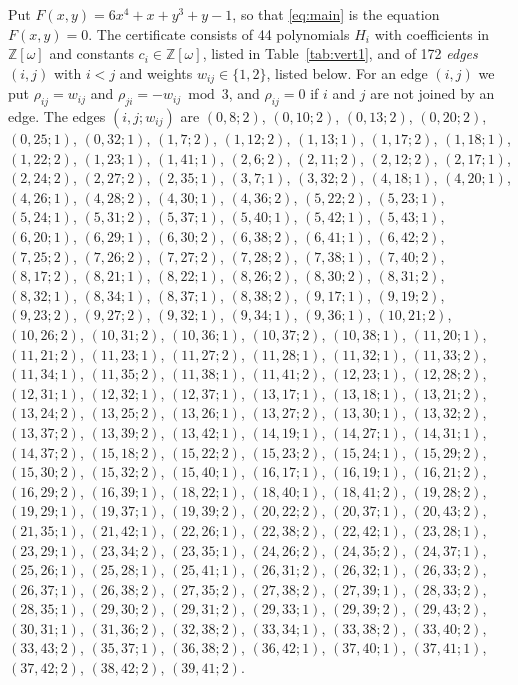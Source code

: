 \documentclass[11pt]{article}
\newcommand{\Z}{\mathbb{Z}}
\begin{document}
Put $F(x,y)=6x^{4}+x+y^{3}+y-1$, so that \eqref{eq:main} is the equation $F(x,y)=0$. The certificate consists of 44 polynomials $H_i$ with coefficients in $\Z[\omega]$ and constants $c_i\in\Z[\omega]$, listed in Table~\ref{tab:vert1}, and of 172 \emph{edges} $(i,j)$ with $i<j$ and weights $w_{ij}\in\{1,2\}$, listed below. For an edge $(i,j)$ we put $\rho_{ij}=w_{ij}$ and $\rho_{ji}=-w_{ij}\bmod 3$, and $\rho_{ij}=0$ if $i$ and $j$ are not joined by an edge.
The edges $(i,j;w_{ij})$ are $(0,8;2)$, $(0,10;2)$, $(0,13;2)$, $(0,20;2)$, $(0,25;1)$, $(0,32;1)$, $(1,7;2)$, $(1,12;2)$, $(1,13;1)$, $(1,17;2)$, $(1,18;1)$, $(1,22;2)$, $(1,23;1)$, $(1,41;1)$, $(2,6;2)$, $(2,11;2)$, $(2,12;2)$, $(2,17;1)$, $(2,24;2)$, $(2,27;2)$, $(2,35;1)$, $(3,7;1)$, $(3,32;2)$, $(4,18;1)$, $(4,20;1)$, $(4,26;1)$, $(4,28;2)$, $(4,30;1)$, $(4,36;2)$, $(5,22;2)$, $(5,23;1)$, $(5,24;1)$, $(5,31;2)$, $(5,37;1)$, $(5,40;1)$, $(5,42;1)$, $(5,43;1)$, $(6,20;1)$, $(6,29;1)$, $(6,30;2)$, $(6,38;2)$, $(6,41;1)$, $(6,42;2)$, $(7,25;2)$, $(7,26;2)$, $(7,27;2)$, $(7,28;2)$, $(7,38;1)$, $(7,40;2)$, $(8,17;2)$, $(8,21;1)$, $(8,22;1)$, $(8,26;2)$, $(8,30;2)$, $(8,31;2)$, $(8,32;1)$, $(8,34;1)$, $(8,37;1)$, $(8,38;2)$, $(9,17;1)$, $(9,19;2)$, $(9,23;2)$, $(9,27;2)$, $(9,32;1)$, $(9,34;1)$, $(9,36;1)$, $(10,21;2)$, $(10,26;2)$, $(10,31;2)$, $(10,36;1)$, $(10,37;2)$, $(10,38;1)$, $(11,20;1)$, $(11,21;2)$, $(11,23;1)$, $(11,27;2)$, $(11,28;1)$, $(11,32;1)$, $(11,33;2)$, $(11,34;1)$, $(11,35;2)$, $(11,38;1)$, $(11,41;2)$, $(12,23;1)$, $(12,28;2)$, $(12,31;1)$, $(12,32;1)$, $(12,37;1)$, $(13,17;1)$, $(13,18;1)$, $(13,21;2)$, $(13,24;2)$, $(13,25;2)$, $(13,26;1)$, $(13,27;2)$, $(13,30;1)$, $(13,32;2)$, $(13,37;2)$, $(13,39;2)$, $(13,42;1)$, $(14,19;1)$, $(14,27;1)$, $(14,31;1)$, $(14,37;2)$, $(15,18;2)$, $(15,22;2)$, $(15,23;2)$, $(15,24;1)$, $(15,29;2)$, $(15,30;2)$, $(15,32;2)$, $(15,40;1)$, $(16,17;1)$, $(16,19;1)$, $(16,21;2)$, $(16,29;2)$, $(16,39;1)$, $(18,22;1)$, $(18,40;1)$, $(18,41;2)$, $(19,28;2)$, $(19,29;1)$, $(19,37;1)$, $(19,39;2)$, $(20,22;2)$, $(20,37;1)$, $(20,43;2)$, $(21,35;1)$, $(21,42;1)$, $(22,26;1)$, $(22,38;2)$, $(22,42;1)$, $(23,28;1)$, $(23,29;1)$, $(23,34;2)$, $(23,35;1)$, $(24,26;2)$, $(24,35;2)$, $(24,37;1)$, $(25,26;1)$, $(25,28;1)$, $(25,41;1)$, $(26,31;2)$, $(26,32;1)$, $(26,33;2)$, $(26,37;1)$, $(26,38;2)$, $(27,35;2)$, $(27,38;2)$, $(27,39;1)$, $(28,33;2)$, $(28,35;1)$, $(29,30;2)$, $(29,31;2)$, $(29,33;1)$, $(29,39;2)$, $(29,43;2)$, $(30,31;1)$, $(31,36;2)$, $(32,38;2)$, $(33,34;1)$, $(33,38;2)$, $(33,40;2)$, $(33,43;2)$, $(35,37;1)$, $(36,38;2)$, $(36,42;1)$, $(37,40;1)$, $(37,41;1)$, $(37,42;2)$, $(38,42;2)$, $(39,41;2)$.
\end{document}
